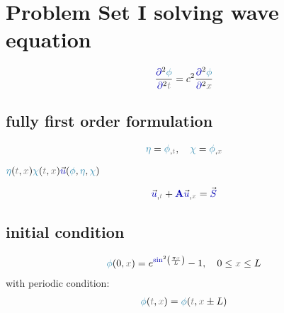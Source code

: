 \documentclass[10pt,fleqn,reqno,a4paper]{article}
\begin{document}
\section{Problem Set I solving wave equation}

\begin{align}
	\frac{\opartial^2\nphi}{\opartial^2\ct} = c^2\frac{\opartial^2\nphi}{\opartial^2\cx}
\end{align}

\subsection{fully first order formulation}

\begin{align}
	\neta = \nphi_{,\ct}, \quad \nchi = \nphi_{,\cx}
\end{align}

$ \neta(\ct,\cx) \nchi(\ct,\cx) \vfu(\nphi,\neta,\nchi) $


\begin{align}
	\vfu_{,\ct}+\MA\vfu_{,\cx}=\vfS
\end{align}

\subsection{initial condition}

\begin{align}
	\nphi(0, \cx)=e^{\fsin^2\left(\frac{\pi \cx}{L}\right)} -1, \quad 0 \leq \cx \leq L
\end{align}
with periodic condition:
\begin{align}
	\nphi(\ct,\cx) = \nphi(\ct, \cx \pm L)
\end{align}
\end{document}
